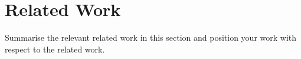 \documentclass[../report.tex]{subfiles}
\begin{document}
    \section{Related Work}
    \label{sec:related_work}

    Summarise the relevant related work in this section and position your work with respect to the related work.
\end{document}

